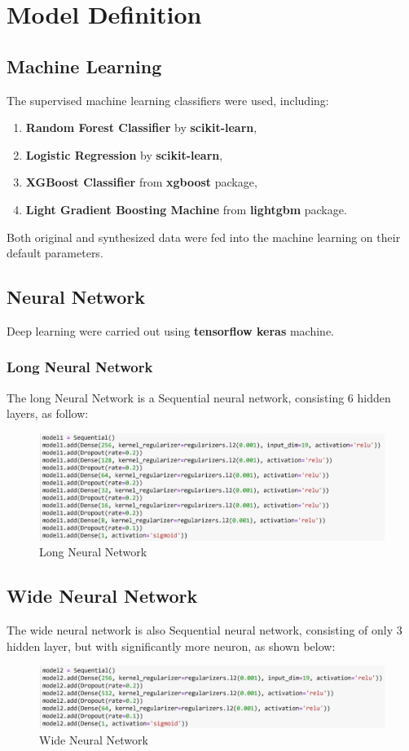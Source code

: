 \documentclass{homeworg}
\begin{document}
\section{Model Definition}
\subsection{Machine Learning}
The supervised machine learning classifiers were used, including:
\begin{enumerate}
    \item \textbf{Random Forest Classifier} by \textbf{scikit-learn},
    \item \textbf{Logistic Regression} by \textbf{scikit-learn},
    \item \textbf{XGBoost Classifier} from \textbf{xgboost} package,
    \item \textbf{Light Gradient Boosting Machine} from \textbf{lightgbm} package.
\end{enumerate}
Both original and synthesized data were fed into the machine learning on their default parameters.
\subsection{Neural Network}
Deep learning were carried out using \textbf{tensorflow keras} machine.
\subsubsection{Long Neural Network}
The long Neural Network is a Sequential neural network, consisting 6 hidden layers, as follow:
\begin{figure}[H]
    \centering
    \includegraphics[scale=0.6]{figure/Long NN.jpg}
    \caption{Long Neural Network}
    \label{fig:longNN}
\end{figure}

\subsection{Wide Neural Network}
The wide neural network is also Sequential neural network, consisting of only 3 hidden layer, but with significantly more neuron, as shown below:
\begin{figure}[H]
    \centering
    \includegraphics[scale=0.6]{figure/Wide NN.jpg}
    \caption{Wide Neural Network}
    \label{fig:wideNN}
\end{figure}
\end{document}
